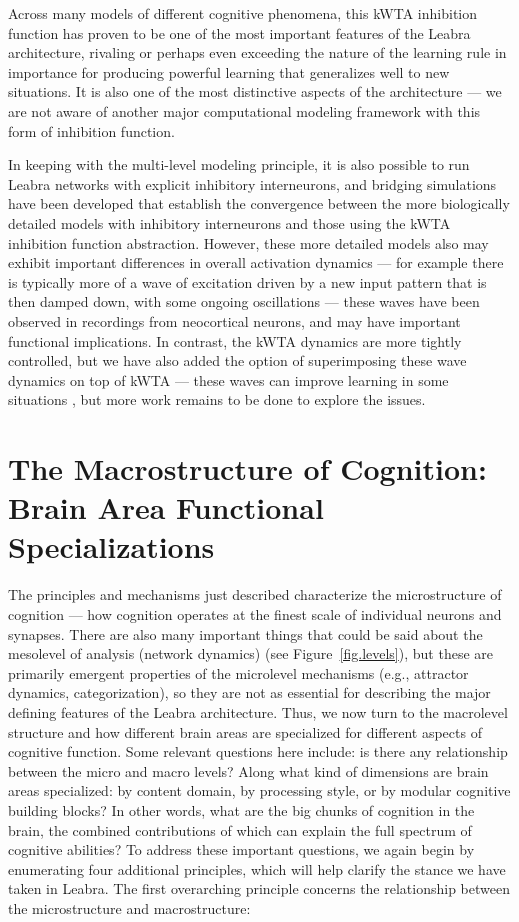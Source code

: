\documentclass[11pt,twoside]{article}
\begin{document}
Across many models of different cognitive phenomena, this kWTA inhibition
function has proven to be one of the most important features of the Leabra
architecture, rivaling or perhaps even exceeding the nature of the learning
rule in importance for producing powerful learning that generalizes well to
new situations.  It is also one of the most distinctive aspects of the
architecture --- we are not aware of another major computational modeling
framework with this form of inhibition function.

In keeping with the multi-level modeling principle, it is also possible to run
Leabra networks with explicit inhibitory interneurons, and bridging
simulations have been developed that establish the convergence between the
more biologically detailed models with inhibitory interneurons and those using
the kWTA inhibition function abstraction.  However, these more detailed models
also may exhibit important differences in overall activation dynamics --- for
example there is typically more of a wave of excitation driven by a new input
pattern that is then damped down, with some ongoing oscillations --- these
waves have been observed in recordings from neocortical neurons, and may have
important functional implications.  In contrast, the kWTA dynamics are more
tightly controlled, but we have also added the option of superimposing these
wave dynamics on top of kWTA --- these waves can improve learning in some
situations \cite{NormanNewmanDetreEtAl06}, but more work remains to be done to
explore the issues.


\section{The Macrostructure of Cognition: Brain Area Functional Specializations}

The principles and mechanisms just described characterize the microstructure
of cognition --- how cognition operates at the finest scale of individual
neurons and synapses.  There are also many important things that could be said
about the mesolevel of analysis (network dynamics) (see
Figure~\ref{fig.levels}), but these are primarily emergent properties of the
microlevel mechanisms (e.g., attractor dynamics, categorization), so they are
not as essential for describing the major defining features of the Leabra
architecture.  Thus, we now turn to the macrolevel structure and how different
brain areas are specialized for different aspects of cognitive function.  Some
relevant questions here include: is there any relationship between the micro
and macro levels?  Along what kind of dimensions are brain areas specialized:
by content domain, by processing style, or by modular cognitive building
blocks?  In other words, what are the big chunks of cognition in the brain,
the combined contributions of which can explain the full spectrum of cognitive
abilities?  To address these important questions, we again begin by
enumerating four additional principles, which will help clarify the stance we
have taken in Leabra.  The first overarching principle concerns the
relationship between the microstructure and macrostructure:
\end{document}
